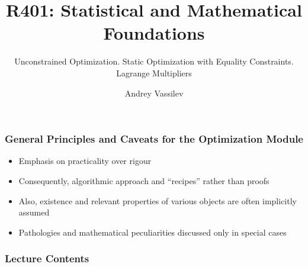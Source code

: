 \documentclass[10pt]{beamer}
\title{R401: Statistical and Mathematical Foundations \bigskip}
\subtitle{\textcolor{myred}{Unconstrained Optimization. Static Optimization with Equality Constraints. Lagrange Multipliers}}
\author{Andrey Vassilev}
\date{}
\theoremstyle{definition}
\begin{document}
\maketitle

\begin{frame}[fragile]
\frametitle{General Principles and Caveats for the Optimization Module}
\begin{itemize}
\item Emphasis on practicality over rigour
\item Consequently, algorithmic approach and ``recipes'' rather than proofs
\item Also, existence and relevant properties of various objects are often implicitly assumed
\item Pathologies and mathematical peculiarities discussed only in special cases
\end{itemize}
\end{frame}

\begin{frame}[fragile]
\frametitle{Lecture Contents}
\tableofcontents
\end{frame}
\end{document}

